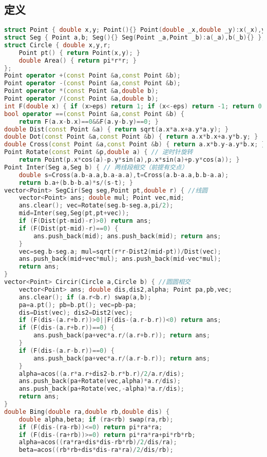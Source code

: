 \documentclass[landscape,a4paper]{article}
\begin{document}
\subsection{定义}
\begin{lstlisting}[language=C++]
struct Point { double x,y; Point(){} Point(double _x,double _y):x(_x),y(_y){} };
struct Seg { Point a,b; Seg(){} Seg(Point _a,Point _b):a(_a),b(_b){} };
struct Circle { double x,y,r;
	Point pt() { return Point(x,y); }
	double Area() { return pi*r*r; }
};
Point operator +(const Point &a,const Point &b);
Point operator -(const Point &a,const Point &b);
Point operator *(const Point &a,double b);
Point operator /(const Point &a,double b);
int F(double x) { if (x>eps) return 1; if (x<-eps) return -1; return 0; }
bool operator ==(const Point &a,const Point &b) {
	return F(a.x-b.x)==0&&F(a.y-b.y)==0; }
double Dist(const Point &a) { return sqrt(a.x*a.x+a.y*a.y); }
double Dot(const Point &a,const Point &b) { return a.x*b.x+a.y*b.y; }
double Cross(const Point &a,const Point &b) { return a.x*b.y-a.y*b.x; }
Point Rotate(const Point &p,double a) { // 逆时针旋转
	return Point(p.x*cos(a)-p.y*sin(a),p.x*sin(a)+p.y*cos(a)); }
Point Inter(Seg a,Seg b) { // 两线段相交（前提有交点）
	double s=Cross(a.b-a.a,b.a-a.a),t=Cross(a.b-a.a,b.b-a.a);
	return b.a+(b.b-b.a)*s/(s-t); }
vector<Point> SegCir(Seg seg,Point pt,double r) { //线圆
	vector<Point> ans; double mul; Point vec,mid;
	ans.clear(); vec=Rotate(seg.b-seg.a,pi/2);
	mid=Inter(seg,Seg(pt,pt+vec));
	if (F(Dist(pt-mid)-r)>0) return ans;
	if (F(Dist(pt-mid)-r)==0) {
		ans.push_back(mid); ans.push_back(mid); return ans;
	}
	vec=seg.b-seg.a; mul=sqrt(r*r-Dist2(mid-pt))/Dist(vec);
	ans.push_back(mid+vec*mul); ans.push_back(mid-vec*mul);
	return ans;
}
vector<Point> Circir(Circle a,Circle b) { //圆圆相交
	vector<Point> ans; double dis,dis2,alpha; Point pa,pb,vec;
	ans.clear(); if (a.r<b.r) swap(a,b);
	pa=a.pt(); pb=b.pt(); vec=pb-pa;
	dis=Dist(vec); dis2=Dist2(vec);
	if (F(dis-(a.r+b.r))>0||F(dis-(a.r-b.r))<0) return ans;
	if (F(dis-(a.r+b.r))==0) {
		ans.push_back(pa+vec*a.r/(a.r+b.r)); return ans;
    }
	if (F(dis-(a.r-b.r))==0) {
		ans.push_back(pa+vec*a.r/(a.r-b.r)); return ans;
	}
	alpha=acos((a.r*a.r+dis2-b.r*b.r)/2/a.r/dis);
	ans.push_back(pa+Rotate(vec,alpha)*a.r/dis);
	ans.push_back(pa+Rotate(vec,-alpha)*a.r/dis);
	return ans;
}
double Bing(double ra,double rb,double dis) {
	double alpha,beta; if (ra<rb) swap(ra,rb);
	if (F(dis-(ra-rb))<=0) return pi*ra*ra;
	if (F(dis-(ra+rb))>=0) return pi*ra*ra+pi*rb*rb;
	alpha=acos((ra*ra+dis*dis-rb*rb)/2/dis/ra);
	beta=acos((rb*rb+dis*dis-ra*ra)/2/dis/rb);

\end{lstlisting}
\end{document}
